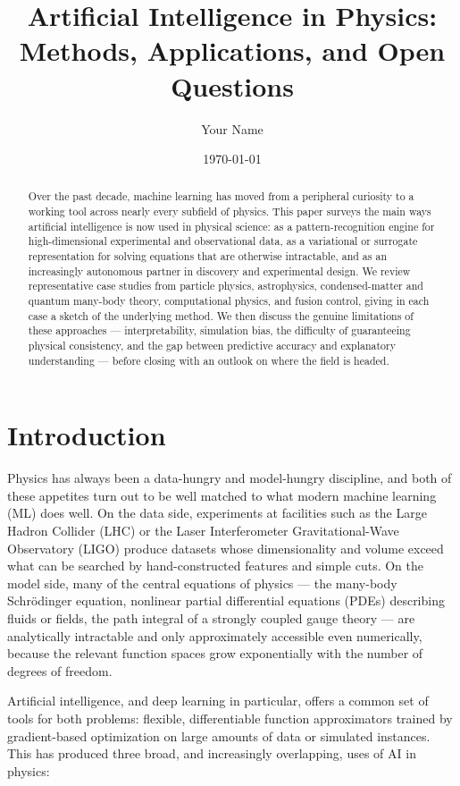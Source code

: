 \documentclass[11pt]{article}
\title{\bfseries Artificial Intelligence in Physics: \\ Methods, Applications, and Open Questions}
\author{Your Name}
\affil{Your Affiliation}
\date{\today}
\begin{document}
\maketitle

\begin{abstract}
\noindent Over the past decade, machine learning has moved from a peripheral curiosity to a working tool across nearly every subfield of physics. This paper surveys the main ways artificial intelligence is now used in physical science: as a pattern-recognition engine for high-dimensional experimental and observational data, as a variational or surrogate representation for solving equations that are otherwise intractable, and as an increasingly autonomous partner in discovery and experimental design. We review representative case studies from particle physics, astrophysics, condensed-matter and quantum many-body theory, computational physics, and fusion control, giving in each case a sketch of the underlying method. We then discuss the genuine limitations of these approaches --- interpretability, simulation bias, the difficulty of guaranteeing physical consistency, and the gap between predictive accuracy and explanatory understanding --- before closing with an outlook on where the field is headed.
\end{abstract}

\tableofcontents

\section{Introduction}

Physics has always been a data-hungry and model-hungry discipline, and both of these appetites turn out to be well matched to what modern machine learning (ML) does well. On the data side, experiments at facilities such as the Large Hadron Collider (LHC) or the Laser Interferometer Gravitational-Wave Observatory (LIGO) produce datasets whose dimensionality and volume exceed what can be searched by hand-constructed features and simple cuts. On the model side, many of the central equations of physics --- the many-body Schr\"odinger equation, nonlinear partial differential equations (PDEs) describing fluids or fields, the path integral of a strongly coupled gauge theory --- are analytically intractable and only approximately accessible even numerically, because the relevant function spaces grow exponentially with the number of degrees of freedom.

Artificial intelligence, and deep learning in particular, offers a common set of tools for both problems: flexible, differentiable function approximators trained by gradient-based optimization on large amounts of data or simulated instances. This has produced three broad, and increasingly overlapping, uses of AI in physics:
\end{document}
